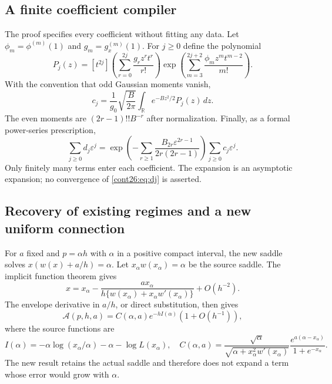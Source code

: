 \documentclass[11pt,letterpaper]{article}
\numberwithin{equation}{section}
\theoremstyle{plain}
\theoremstyle{definition}
\theoremstyle{remark}
\begin{document}
\subsection{A finite coefficient compiler}
The proof specifies every coefficient without fitting any data. Let
$\phi_m=\phi^{(m)}(1)$ and $g_m=g_x^{(m)}(1)$.
For $j\geq0$ define the polynomial
\begin{equation}\label{cont26:eq:cj-polynomial}
 P_j(z)=[t^{2j}]
 \left(\sum_{r=0}^{2j}\frac{g_rz^rt^r}{r!}\right)
 \exp\left(\sum_{m=3}^{2j+2}\frac{\phi_mz^mt^{m-2}}{m!}\right).
\end{equation}
With the convention that odd Gaussian moments vanish,
\begin{equation}\label{cont26:eq:cj}
 c_j=\frac1{g_0}\sqrt{\frac B{2\pi}}
      \int_{\mathbb R}e^{-Bz^2/2}P_j(z)\,dz.
\end{equation}
The even moments are $(2r-1)!!B^{-r}$ after normalization.
Finally, as a formal power-series prescription,
\begin{equation}\label{cont26:eq:dj}
 \sum_{j\geq0}d_j\varepsilon^j
 =\exp\left(-\sum_{r\geq1}
 \frac{B_{2r}\varepsilon^{2r-1}}{2r(2r-1)}\right)
     \sum_{j\geq0}c_j\varepsilon^j.
\end{equation}
Only finitely many terms enter each coefficient. The expansion is an
asymptotic expansion; no convergence of \eqref{cont26:eq:dj} is asserted.

\subsection{Recovery of existing regimes and a new uniform connection}
For $a$ fixed and $p=\alpha h$ with $\alpha$ in a positive compact
interval, the new saddle solves
$x(w(x)+a/h)=\alpha$. Let $x_\alpha w(x_\alpha)=\alpha$ be the
source saddle. The implicit function theorem gives
\[
 x=x_\alpha-\frac{a x_\alpha}{h\{w(x_\alpha)+x_\alpha w'(x_\alpha)\}}
 +O(h^{-2}).
\]
The envelope derivative in $a/h$, or direct substitution, then gives
\begin{equation}\label{cont26:eq:old-recovery}
 \mathcal A(p,h,a)
 =C(\alpha,a)e^{-hI(\alpha)}(1+O(h^{-1})),
\end{equation}
where the source functions are
\[
 I(\alpha)=-\alpha\log(x_\alpha/\alpha)-\alpha-\log L(x_\alpha),
 \quad
 C(\alpha,a)=
 \frac{\sqrt{\alpha}}{\sqrt{\alpha+x_\alpha^2w'(x_\alpha)}}
 \frac{e^{a(\alpha-x_\alpha)}}{1+e^{-x_\alpha}}.
\]
The new result retains the actual saddle and therefore does not
expand a term whose error would grow with $\alpha$.
\end{document}
